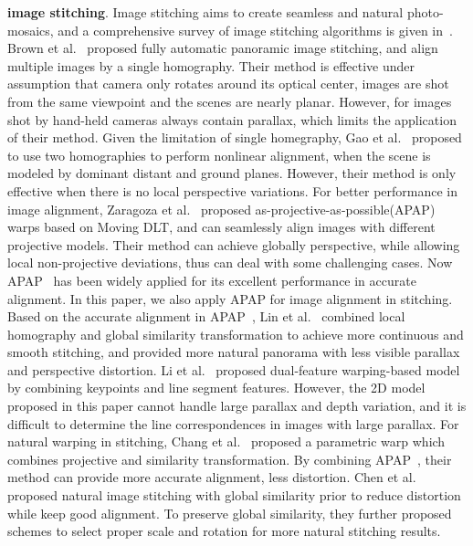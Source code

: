 \documentclass[10pt,journal,compsoc]{IEEEtran}
\begin{document}
\textbf{image stitching}.
Image stitching aims to create seamless and natural photo-mosaics, and a comprehensive survey of image stitching algorithms is given in~\cite{journals/ftcgv/Szeliski06}.
Brown et al.~\cite{journals/ijcv/BrownL07} proposed fully automatic panoramic image stitching, and align multiple images by a single homography. Their method is effective under assumption that camera only rotates around its optical center, images are shot from the same viewpoint and the scenes are nearly planar. However, for images shot by hand-held cameras always contain parallax, which limits the application of their method.
Given the limitation of single homegraphy, Gao et al.~\cite{conf/CVPR/GaoKB11} proposed to use two homographies to perform nonlinear alignment, when the scene is modeled by dominant distant and ground planes. However, their method is only effective when there is no local perspective variations.
For better performance in image alignment, Zaragoza et al.~\cite{journals/pami/ZaragozaCTBS14} proposed as-projective-as-possible(APAP) warps based on Moving DLT, and can seamlessly align images with different projective models. Their method can achieve globally perspective, while allowing local non-projective deviations, thus can deal with some challenging cases. Now APAP~\cite{journals/pami/ZaragozaCTBS14}  has been widely applied for its excellent performance in accurate alignment. In this paper, we also apply APAP for image alignment in stitching.
Based on the accurate alignment in APAP~\cite{journals/pami/ZaragozaCTBS14}, Lin et al.~\cite{conf/CVPR/LinPRA15} combined local homography and global similarity transformation to achieve more continuous and smooth stitching, and provided more natural panorama with less visible parallax and perspective distortion.
Li et al.~\cite{conf/ICCV/LiY0Q15} proposed dual-feature warping-based model by combining keypoints and line segment features. However, the 2D model proposed in this paper cannot handle large parallax and depth variation, and it is difficult to determine the line correspondences in images with large parallax.
For natural warping in stitching, Chang et al.~\cite{conf/cvpr/ChangSC14} proposed a parametric warp which combines projective and similarity transformation. By combining APAP~\cite{journals/pami/ZaragozaCTBS14}, their method can provide more accurate alignment, less distortion.
Chen et al.~\cite{conf/eccv/ChenC16} proposed natural image stitching with global similarity prior to reduce distortion while keep good alignment. To preserve global similarity, they further proposed schemes to select proper scale and rotation for more natural stitching results.
\end{document}

